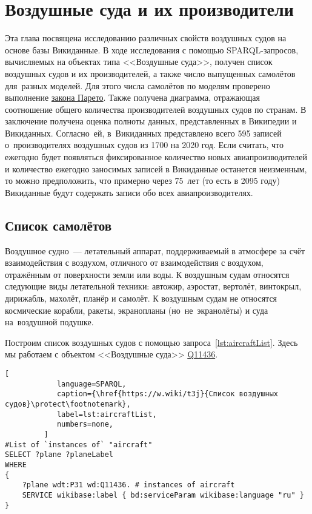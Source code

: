 \chapter{Воздушные суда и их производители}%
\label{ch:aircraft-chapter}

Эта глава посвящена исследованию различных свойств воздушных судов на основе базы Викиданные. 
В ходе исследования с помощью SPARQL-запросов, вычисляемых на объектах типа <<Воздушные суда>>, 
получен список воздушных судов и их производителей, 
а также число выпущенных самолётов для~разных моделей. Для этого числа самолётов по моделям проверено выполнение \href{https://w.wiki/vDs}{закона Парето}. 
Также получена диаграмма, отражающая соотношение общего количества производителей воздушных судов по странам. 
В заключение получена оценка полноты данных, представленных в Википедии и Викиданных. 
Согласно~ей, в~Викиданных представлено всего 595 записей о~производителях воздушных судов из \num{1700} на 2020 год.
Если считать, что ежегодно будет появляться фиксированное количество новых авиапроизводителей 
и количество ежегодно заносимых записей в Викиданные останется неизменным, 
то можно предположить, что примерно через 75~лет (то есть в 2095 году) Викиданные будут содержать записи обо всех авиапроизводителях.

\section{Список самолётов}

Воздушное судно~--- летательный аппарат, поддерживаемый в атмосфере 
за счёт взаимодействия с воздухом, отличного от взаимодействия с воздухом, отражённым от поверхности земли или воды.
К воздушным судам относятся следующие виды летательной техники: 
автожир, аэростат, вертолёт, винтокрыл, дирижабль, махолёт, планёр и самолёт.
К воздушным судам не относятся космические корабли, ракеты, экранопланы (но~не~экранолёты) и суда на~воздушной подушке. 

Построим список воздушных судов с помощью запроса~\ref{lst:aircraftList}. 
Здесь мы работаем с объектом <<Воздушные суда>> \href{https://www.wikidata.org/wiki/Q11436}{Q11436}.

\newpage 


\begin{lstlisting}[ 
            language=SPARQL, 
            caption={\href{https://w.wiki/t3j}{Список воздушных судов}\protect\footnotemark}, 
            label=lst:aircraftList, 
            numbers=none,
         ]
#List of `instances of` "aircraft"
SELECT ?plane ?planeLabel
WHERE
{
    ?plane wdt:P31 wd:Q11436. # instances of aircraft
    SERVICE wikibase:label { bd:serviceParam wikibase:language "ru" }
}
\end{lstlisting}


